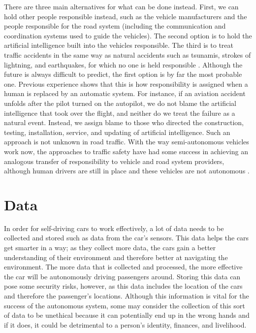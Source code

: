 \documentclass[10pt,twocolumn]{article}
\begin{document}
There are three main alternatives for what can be done instead. First, we can hold other people responsible instead, such as the vehicle manufacturers and the people responsible for the road system (including the communication and coordination systems used to guide the vehicles). The second option is to hold the artificial intelligence built into the vehicles responsible. The third is to treat traffic accidents in the same way as natural accidents such as tsunamis, strokes of lightning, and earthquakes, for which no one is held responsible \cite{EthicalOverview}. Although the future is always difficult to predict, the first option is by far the most probable one. Previous experience shows that this is how responsibility is assigned when a human is replaced by an automatic system. For instance, if an aviation accident unfolds after the pilot turned on the autopilot, we do not blame the artificial intelligence that took over the flight, and neither do we treat the failure as a natural event. Instead, we assign blame to those who directed the construction, testing, installation, service, and updating of artificial intelligence. Such an approach is not unknown in road traffic. With the way semi-autonomous vehicles work now, the approaches to traffic safety have had some success in achieving an analogous transfer of responsibility to vehicle and road system providers, although human drivers are still in place and these vehicles are not autonomous \cite{EthicalOverview}.

\section{Data}
In order for self-driving cars to work effectively, a lot of data needs to be collected and stored such as data from the car’s sensors. This data helps the cars get smarter in a way; as they collect more data, the cars gain a better understanding of their environment and therefore better at navigating the environment. The more data that is collected and processed, the more effective the car will be autonomously driving passengers around. Storing this data can pose some security risks, however, as this data includes the location of the cars and therefore the passenger’s locations. Although this information is vital for the success of the autonomous system, some may consider the collection of this sort of data to be unethical because it can potentially end up in the wrong hands and if it does, it could be detrimental to a person’s identity, finances, and livelihood. 
\end{document}
